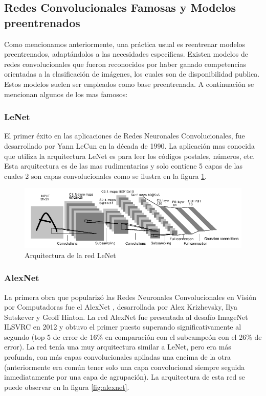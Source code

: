 \documentclass[a4paper,11pt,spanish]{book}
\begin{document}
      
      \subsection{Redes Convolucionales Famosas y Modelos preentrenados} \label{sec:cnn_famosas}
	Como mencionamos anteriormente, una práctica usual es reentrenar modelos preentrenados, adaptándolos a las necesidades especificas. 
	Existen modelos de redes convolucionales que fueron reconocidos por haber ganado competencias orientadas a la clasificación de imágenes, 
	los cuales son de disponibilidad publica. Estos modelos suelen ser empleados como base 
	preentrenada. A continuación se mencionan algunos de los mas famosos:
	
	\subsubsection{LeNet}
	  El primer éxito en las aplicaciones de Redes Neuronales Convolucionales, fue desarrollado por Yann LeCun \cite{Lecun:LeNet} en la década de 1990.
	  La aplicación mas conocida que utiliza la arquitectura LeNet es para leer los códigos postales, números, etc. Esta arquitectura es de las mas rudimentarias y 
	  solo contiene 5 capas de las cuales 2 son capas convolucionales como se ilustra en la figura \ref{fig:lenet}. 
	  
	  \begin{figure}[h]
	    \begin{center}
	    \includegraphics[width=0.6\linewidth]{./img/lenet.png}
	    \end{center}
	    \caption{Arquitectura de la red LeNet}
	    \label{fig:lenet}
	  \end{figure}

	\subsubsection{AlexNet} \label{sec:alexnet}
	  La primera obra que popularizó las Redes Neuronales Convolucionales en Visión por Computadoras fue el AlexNet  \cite{AlexNet}, desarrollada por Alex Krizhevsky, 
	  Ilya Sutskever y Geoff Hinton.
	  La red AlexNet fue presentada al desafío ImageNet ILSVRC  en 2012 y obtuvo el primer puesto superando significativamente al segundo (top 5 de error de 16\% en
	  comparación con el subcampeón con el 26\% de error). 
	  La red tenía una muy arquitectura similar a LeNet, pero era más profunda, con más  capas convolucionales apiladas una encima de la otra
	  (anteriormente era común tener solo una capa convolucional siempre seguida inmediatamente por una capa de agrupación). La arquitectura de esta red se puede observar en la figura 
	  \ref{fig:alexnet}.
	  
\end{document}
